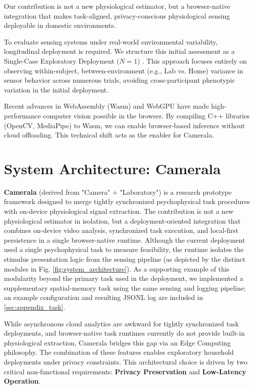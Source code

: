 \documentclass[final,3p,times,twocolumn]{elsarticle}
\begin{document}
Our contribution is not a new physiological estimator, but a browser-native integration that makes task-aligned, privacy-conscious physiological sensing deployable in domestic environments.

To evaluate sensing systems under real-world environmental variability, longitudinal deployment is required. We structure this initial assessment as a Single-Case Exploratory Deployment ($N=1$) \cite{barlow_sced}. This approach focuses entirely on observing within-subject, between-environment (e.g., Lab vs. Home) variance in sensor behavior across numerous trials, avoiding cross-participant phenotypic variation in the initial deployment.

Recent advances in WebAssembly (Wasm) and WebGPU have made high-performance computer vision possible in the browser.
By compiling C++ libraries (OpenCV, MediaPipe) to Wasm, we can enable browser-based inference without cloud offloading. This technical shift acts as the enabler for Camerala.

\section{System Architecture: Camerala}
\textbf{Camerala} (derived from "Camera" + "Laboratory") is a research prototype framework designed to merge tightly synchronized psychophysical task procedures with on-device physiological signal extraction. The contribution is not a new physiological estimator in isolation, but a deployment-oriented integration that combines on-device video analysis, synchronized task execution, and local-first persistence in a single browser-native runtime. Although the current deployment used a single psychophysical task to measure feasibility, the runtime isolates the stimulus presentation logic from the sensing pipeline (as depicted by the distinct modules in Fig. \ref{fig:system_architecture}). As a supporting example of this modularity beyond the primary task used in the deployment, we implemented a supplementary spatial-memory task using the same sensing and logging pipeline; an example configuration and resulting JSONL log are included in \ref{sec:appendix_task}.

While asynchronous cloud analytics are awkward for tightly synchronized task deployments, and browser-native task runtimes currently do not provide built-in physiological extraction, Camerala bridges this gap via an Edge Computing philosophy. The combination of these features enables exploratory household deployments under privacy constraints. This architectural choice is driven by two critical non-functional requirements: \textbf{Privacy Preservation} and \textbf{Low-Latency Operation}.
\end{document}
